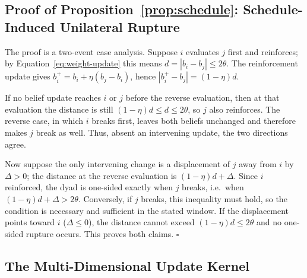 \subsection{Proof of Proposition~\ref{prop:schedule}: Schedule-Induced Unilateral Rupture}
\label{app:proof_schedule}

The proof is a two-event case analysis. Suppose $i$ evaluates $j$ first and reinforces; by
Equation~\eqref{eq:weight-update} this means $d=|b_i-b_j|\le 2\theta$. The reinforcement
update gives $b_i^+ = b_i + \eta(b_j-b_i)$, hence $|b_i^+-b_j|=(1-\eta)d$.

If no belief update reaches $i$ or $j$ before the reverse evaluation, then at that
evaluation the distance is still $(1-\eta)d\le d\le 2\theta$, so $j$ also reinforces. The
reverse case, in which $i$ breaks first, leaves both beliefs unchanged and therefore makes
$j$ break as well. Thus, absent an intervening update, the two directions agree.

Now suppose the only intervening change is a displacement of $j$ away from $i$ by
$\Delta>0$; the distance at the reverse evaluation is $(1-\eta)d+\Delta$. Since $i$
reinforced, the dyad is one-sided exactly when $j$ breaks, i.e.\ when
$(1-\eta)d+\Delta>2\theta$. Conversely, if $j$ breaks, this inequality must hold, so the
condition is necessary and sufficient in the stated window. If the displacement points
toward $i$ ($\Delta\le 0$), the distance cannot exceed $(1-\eta)d\le 2\theta$ and no
one-sided rupture occurs. This proves both claims. $\square$

\subsection{The Multi-Dimensional Update Kernel}
\label{app:kernel}


